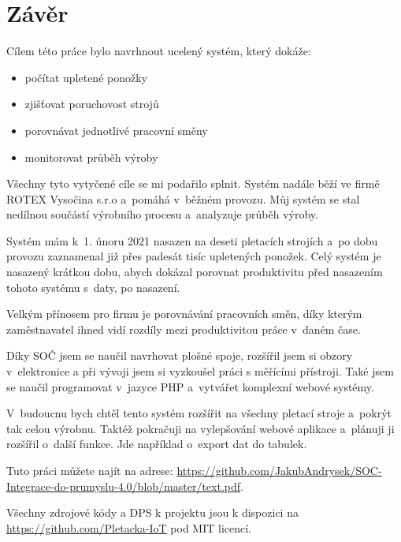 \chapter*{Závěr}

Cílem této práce bylo navrhnout ucelený systém, který dokáže:

\begin{itemize}
    \item počítat upletené ponožky
    \item zjišťovat poruchovost strojů
    \item porovnávat jednotlivé pracovní směny
    \item monitorovat průběh výroby
\end{itemize}

Všechny tyto vytyčené cíle se mi podařilo splnit. Systém nadále běží ve firmě ROTEX Vysočina s.r.o \cite{ROTEX} a~pomáhá v~běžném provozu.
Můj systém se stal nedílnou součástí výrobního procesu a~analyzuje průběh výroby.

Systém mám k~1. únoru 2021 nasazen na deseti pletacích strojích a~po dobu provozu zaznamenal již přes padesát tisíc upletených ponožek.
Celý systém je nasazený krátkou dobu, abych dokázal porovnat produktivitu před nasazením tohoto systému s~daty, po nasazení.

Velkým přínosem pro firmu je porovnávání pracovních směn, díky kterým zaměstnavatel ihned vidí rozdíly mezi produktivitou práce v~daném čase.

Díky SOČ jsem se naučil navrhovat plošné spoje, rozšířil jsem si obzory v~elektronice a při vývoji jsem si vyzkoušel práci s měřícími přístroji. 
Také jsem se naučil programovat v~jazyce PHP a~vytvářet komplexní webové systémy.

V~budoucnu bych chtěl tento systém rozšířit na všechny pletací stroje a~pokrýt tak celou výrobnu.
Taktéž pokračuji na vylepšování webové aplikace a~plánuji ji rozšířil o~další funkce.
Jde například o~export dat do tabulek.

Tuto práci můžete najít na adrese: \url{https://github.com/JakubAndrysek/SOC-Integrace-do-prumyslu-4.0/blob/master/text.pdf}.

Všechny zdrojové kódy a DPS k projektu jsou k dispozici na \url{https://github.com/Pletacka-IoT} pod MIT licencí.


\newpage